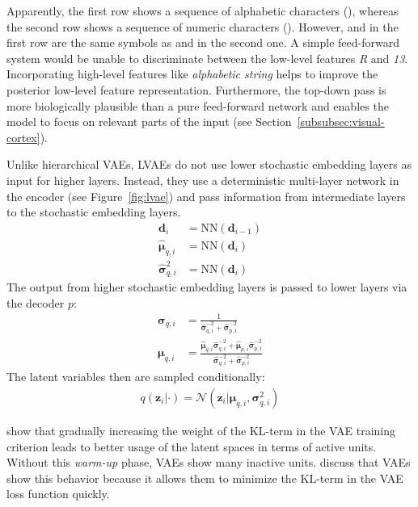 Apparently, the first row shows a sequence of alphabetic characters (), whereas the second row shows a sequence of numeric characters ().
However,  and  in the first row are the same symbols as  and  in the second one.
A simple feed-forward system would be unable to discriminate between the low-level features \textit{R} and \textit{13}.
Incorporating high-level features like \textit{alphabetic string} helps to improve the posterior low-level feature representation.
Furthermore, the top-down pass is more biologically plausible than a pure feed-forward network and enables the model to focus on relevant parts of the input (see Section~\ref{subsubsec:visual-cortex}).


Unlike hierarchical \acp{VAE}, \acp{LVAE} do not use lower stochastic embedding layers as input for higher layers.
Instead, they use a deterministic multi-layer network in the encoder (see Figure~\ref{fig:lvae}) and pass information from intermediate layers to the stochastic embedding layers.
\begin{align}
    \bm{d}_i &= \text{NN}(\bm{d}_{i-1})\\
    \hat{\bm{\mu}}_{q,i}&=\text{NN}(\bm{d}_i)\\
    \hat{\bm{\sigma}}^2_{q,i}&=\text{NN}(\bm{d}_i)
\end{align}
The output from higher stochastic embedding layers is passed to lower layers via the decoder $p$:
\begin{align}
    \bm{\sigma}_{q,i}&=\frac{1}{\hat{\bm{\sigma}}^{-2}_{q,i}+\hat{\bm{\sigma}}^{-2}_{p,i}}\\
    \bm{\mu}_{q,i}&=\frac{\hat{\bm{\mu}}_{q,i}\hat{\bm{\sigma}}^{-2}_{q,i}+\hat{\bm{\mu}}_{p,i}\hat{\bm{\sigma}}^{-2}_{p,i}}{\hat{\bm{\sigma}}^{-2}_{q,i}+\hat{\bm{\sigma}}^{-2}_{p,i}}
\end{align}
The latent variables then are sampled conditionally:
\begin{align}
    q(\bm{z}_i|\cdot)=\mathcal{N}(\bm{z}_i|\bm{\mu}_{q,i},\bm{\sigma}^2_{q,i})
\end{align}

\citet{sonderby2016ladder} show that gradually increasing the weight of the KL-term in the \ac{VAE} training criterion leads to better usage of the latent spaces in terms of active units.
Without this \textit{warm-up} phase, \acp{VAE} show many inactive units.
\citet{sonderby2016ladder} discuss that \acp{VAE} show this behavior because it allows them to minimize the KL-term in the \ac{VAE} loss function quickly.

